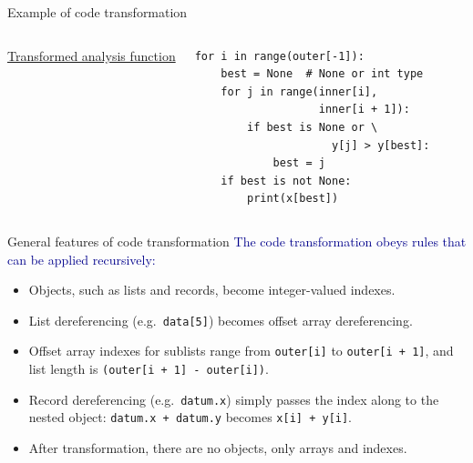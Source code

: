 \documentclass[aspectratio=169]{beamer}
\begin{document}
\begin{frame}[fragile]{Example of code transformation}
\begin{columns}[t]
\underline{\large Transformed analysis function}

\small
\begin{verbatim}
for i in range(outer[-1]):
    best = None  # None or int type
    for j in range(inner[i],
                   inner[i + 1]):
        if best is None or \
                     y[j] > y[best]:
            best = j
    if best is not None:
        print(x[best])
\end{verbatim}

\end{columns}
\end{frame}

\begin{frame}{General features of code transformation}
\vspace{0.5 cm}
\large
\textcolor{darkblue}{The code transformation obeys rules that can be applied recursively:}

\vspace{0.1 cm}
\begin{itemize}\setlength{\itemsep}{0.25 cm}
\item Objects, such as lists and records, become integer-valued indexes.
\item List dereferencing (e.g.\ {\tt\normalsize data[5]}) becomes offset array dereferencing.
\item Offset array indexes for sublists range from {\tt\normalsize outer[i]} to {\tt\normalsize outer[i~+~1]}, and list length is {\tt\normalsize (outer[i + 1] - outer[i])}.
\item Record dereferencing (e.g.\ {\tt\normalsize datum.x}) simply passes the index along to the nested object: {\tt\normalsize datum.x + datum.y} becomes {\tt\normalsize x[i] + y[i]}.
\item After transformation, there are no objects, only arrays and indexes.
\end{itemize}

\normalsize
\vspace{0.25 cm}

\vspace{0.15 cm}
\end{frame}
\end{document}
